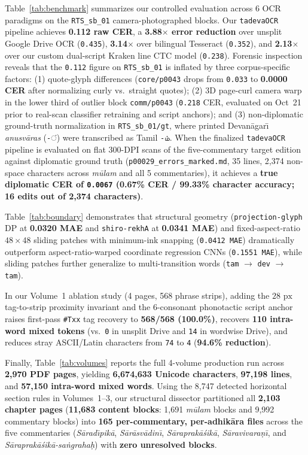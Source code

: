 \documentclass[10pt,twocolumn]{article}
\begin{document}
Table~\ref{tab:benchmark} summarizes our controlled evaluation across 6 OCR paradigms on the \texttt{RTS\_sb\_01} camera-photographed blocks. Our \texttt{tadevaOCR} pipeline achieves \textbf{0.112 raw CER}, a \textbf{3.88$\times$ error reduction} over unsplit Google Drive OCR (\texttt{0.435}), \textbf{3.14$\times$} over bilingual Tesseract (\texttt{0.352}), and \textbf{2.13$\times$} over our custom dual-script Kraken line CTC model (\texttt{0.238}). Forensic inspection reveals that the \texttt{0.112} figure on \texttt{RTS\_sb\_01} is inflated by three corpus-specific factors: (1) quote-glyph differences (\texttt{core/p0043} drops from \texttt{0.033} to \textbf{0.0000 CER} after normalizing curly vs.\ straight quotes); (2) 3D page-curl camera warp in the lower third of outlier block \texttt{comm/p0043} (\texttt{0.218} CER, evaluated on Oct~21 prior to real-scan classifier retraining and script anchors); and (3) non-diplomatic ground-truth normalization in \texttt{RTS\_sb\_01/gt}, where printed Devan\={a}gar\={\i} \emph{anusv\={a}ras} (\texttt{-ं}) were transcribed as Tamil \texttt{-ம்}. When the finalized \texttt{tadevaOCR} pipeline is evaluated on flat 300-DPI scans of the five-commentary target edition against diplomatic ground truth (\texttt{p00029\_errors\_marked.md}, 35 lines, 2,374 non-space characters across \emph{m\={u}lam} and all 5 commentaries), it achieves a \textbf{true diplomatic CER of \texttt{0.0067} (0.67\% CER / 99.33\% character accuracy; 16 edits out of 2,374 characters)}.

Table~\ref{tab:boundary} demonstrates that structural geometry (\texttt{projection-glyph} DP at \textbf{0.0320 MAE} and \texttt{shiro-rekhA} at \textbf{0.0341 MAE}) and fixed-aspect-ratio $48\times 48$ sliding patches with minimum-ink snapping (\texttt{0.0412 MAE}) dramatically outperform aspect-ratio-warped coordinate regression CNNs (\texttt{0.1551 MAE}), while sliding patches further generalize to multi-transition words (\texttt{tam} $\to$ \texttt{dev} $\to$ \texttt{tam}).

In our Volume~1 ablation study (4 pages, 568 phrase strips), adding the $28\text{ px}$ tag-to-strip proximity invariant and the 6-consonant phonotactic script anchor raises first-pass \texttt{\#Txx} tag recovery to \textbf{568/568 (100.0\%)}, recovers \textbf{110 intra-word mixed tokens} (vs.\ \texttt{0} in unsplit Drive and \texttt{14} in wordwise Drive), and reduces stray ASCII/Latin characters from \texttt{74} to \texttt{4} (\textbf{94.6\% reduction}).

Finally, Table~\ref{tab:volumes} reports the full 4-volume production run across \textbf{2,970 PDF pages}, yielding \textbf{6,674,633 Unicode characters}, \textbf{97,198 lines}, and \textbf{57,150 intra-word mixed words}. Using the 8,747 detected horizontal section rules in Volumes~1--3, our structural dissector partitioned all \textbf{2,103 chapter pages} (\textbf{11,683 content blocks}: 1,691 \emph{m\={u}lam} blocks and 9,992 commentary blocks) into \textbf{165 per-commentary, per-adhik\={a}ra files} across the five commentaries (\emph{S\={a}rad\={\i}pik\={a}}, \emph{S\={a}r\={a}sv\={a}din\={\i}}, \emph{S\={a}raprak\={a}\'{s}ik\={a}}, \emph{S\={a}ravivara\d{n}\={\i}}, and \emph{S\={a}raprak\={a}\'{s}ik\={a}-sa\.{n}graha\d{h}}) with \textbf{zero unresolved blocks}.
\end{document}
